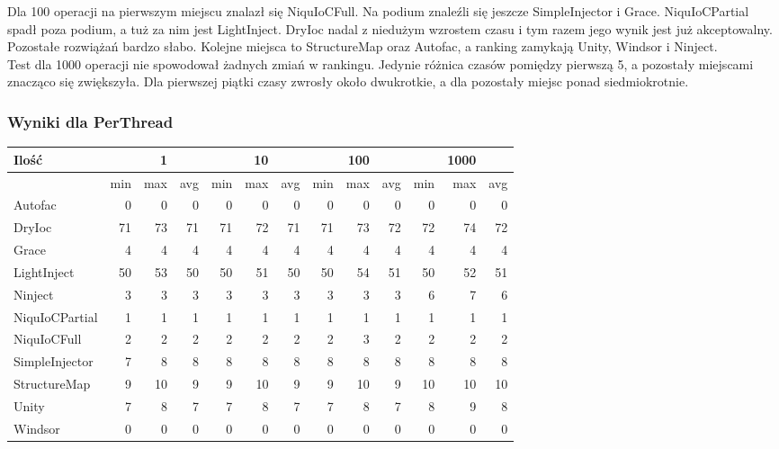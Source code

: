 \documentclass[12pt]{article}
\begin{document}
Dla 100 operacji na pierwszym miejscu znalazł się NiquIoCFull. Na podium znaleźli się jeszcze SimpleInjector i Grace. NiquIoCPartial spadł poza podium, a tuż za nim jest LightInject. DryIoc nadal z niedużym wzrostem czasu i tym razem jego wynik jest już akceptowalny. Pozostałe rozwiążań bardzo słabo. Kolejne miejsca to StructureMap oraz Autofac, a ranking zamykają Unity, Windsor i Ninject.\\
Test dla 1000 operacji nie spowodował żadnych zmiań w rankingu. Jedynie różnica czasów pomiędzy pierwszą 5, a pozostały miejscami znacząco się zwiększyła. Dla pierwszej piątki czasy zwrosły około dwukrotkie, a dla pozostały miejsc ponad siedmiokrotnie.

\subsubsection{Wyniki dla PerThread}
\begin{center}
\begin{small}
	\begin{tabular}{ | l | r r r | r r r | r r r | r r r | }
    		\hline
Ilość & & 1 & & & 10 & & & 100 & & & 1000 & \\ \hline
 & min & max & avg & min & max & avg & min & max & avg & min & max & avg \\ \hline
Autofac & 0 & 0 & 0 & 0 & 0 & 0 & 0 & 0 & 0 & 0 & 0 & 0 \\ \hline
DryIoc & 71 & 73 & 71 & 71 & 72 & 71 & 71 & 73 & 72 & 72 & 74 & 72 \\ \hline
Grace & 4 & 4 & 4 & 4 & 4 & 4 & 4 & 4 & 4 & 4 & 4 & 4 \\ \hline
LightInject & 50 & 53 & 50 & 50 & 51 & 50 & 50 & 54 & 51 & 50 & 52 & 51 \\ \hline
Ninject & 3 & 3 & 3 & 3 & 3 & 3 & 3 & 3 & 3 & 6 & 7 & 6 \\ \hline
NiquIoCPartial & 1 & 1 & 1 & 1 & 1 & 1 & 1 & 1 & 1 & 1 & 1 & 1 \\ \hline
NiquIoCFull & 2 & 2 & 2 & 2 & 2 & 2 & 2 & 3 & 2 & 2 & 2 & 2 \\ \hline
SimpleInjector & 7 & 8 & 8 & 8 & 8 & 8 & 8 & 8 & 8 & 8 & 8 & 8 \\ \hline
StructureMap & 9 & 10 & 9 & 9 & 10 & 9 & 9 & 10 & 9 & 10 & 10 & 10 \\ \hline
Unity & 7 & 8 & 7 & 7 & 8 & 7 & 7 & 8 & 7 & 8 & 9 & 8 \\ \hline
Windsor & 0 & 0 & 0 & 0 & 0 & 0 & 0 & 0 & 0 & 0 & 0 & 0 \\ \hline
  	\end{tabular}
\end{small}
\end{center}
\end{document}
